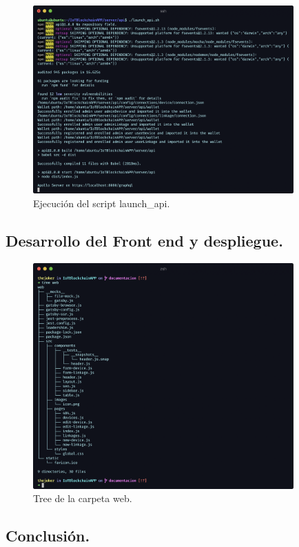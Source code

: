 \begin{figure}[ht!]
  \centering
  \includegraphics[width=10cm]{imagenes/desarrollo/comandos/launch_api}
  \caption{Ejecución del script launch\_api.}
  \label{fig:launch-api}
\end{figure}

\subsection{Desarrollo del Front end y despliegue.}

\begin{figure}[ht!]
  \centering
  \includegraphics[width=10cm]{imagenes/desarrollo/tree_web}
  \caption{Tree de la carpeta web.}
  \label{fig:tree-web}
\end{figure}

\subsection{Conclusión.}

\newpage